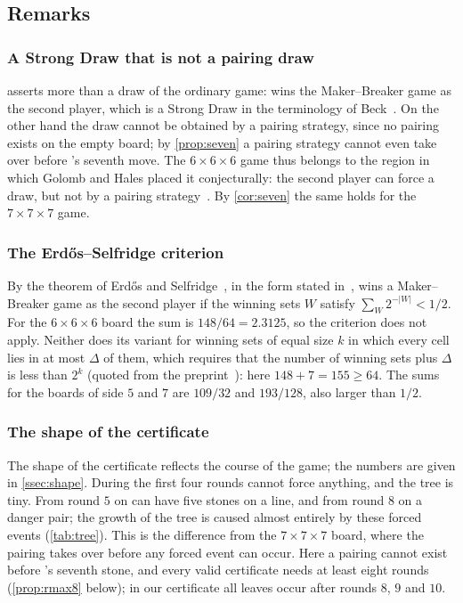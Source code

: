 \subsection{Remarks}\label{ssec:remarks}

\subsubsection*{A Strong Draw that is not a pairing draw}
 asserts more than a draw of the ordinary game: \Breaker{} wins the Maker--Breaker game as
the second player, which is a Strong Draw in the terminology of Beck~\cite{Beck2008}. On the other hand
the draw cannot be obtained by a pairing strategy, since no pairing exists on the empty board; by
\cref{prop:seven} a pairing strategy cannot even take over before \Breaker's seventh move. The
$6\times6\times6$ game thus belongs to the region in which Golomb and Hales placed it conjecturally:
the second player can force a draw, but not by a pairing strategy~\cite[Table~1]{GolombHales2002}. By
\cref{cor:seven} the same holds for the $7\times7\times7$ game.

\subsubsection*{The Erd\H{o}s--Selfridge criterion}
By the theorem of Erd\H{o}s and Selfridge~\cite{ErdosSelfridge1973}, in the form stated
in~\cite[Theorem~4.2]{Krivelevich2014}, \Breaker{} wins a Maker--Breaker game as the second player if the
winning sets $W$ satisfy $\sum_W 2^{-|W|}<1/2$. For the $6\times6\times6$ board the sum is
$148/64=2.3125$, so the criterion does not apply. Neither does its variant for winning sets of equal size
$k$ in which every cell lies in at most $\Delta$ of them, which requires that the number of winning
sets plus $\Delta$ is less than $2^k$ (quoted from the preprint~\cite[Theorem~6.1]{CainRaymondKallersjo2025}): here
$148+7=155\ge 64$. The sums for the boards of
side $5$ and $7$ are $109/32$ and $193/128$, also larger than $1/2$.

\subsubsection*{The shape of the certificate}
The shape of the certificate reflects the course of the game; the numbers are given in
\cref{ssec:shape}. During the first four rounds \Maker{} cannot force anything, and the tree is tiny. From
round $5$ on \Maker{} can have five stones on a line, and from round $8$ on a danger pair; the growth of
the tree is caused almost entirely by these forced events (\cref{tab:tree}). This is the difference from
the $7\times7\times7$ board, where the pairing takes over before any forced event can occur. Here a
pairing cannot exist before \Breaker's seventh stone, and every valid certificate needs at least eight
rounds (\cref{prop:rmax8} below); in our certificate all leaves occur after rounds $8$, $9$ and $10$.

